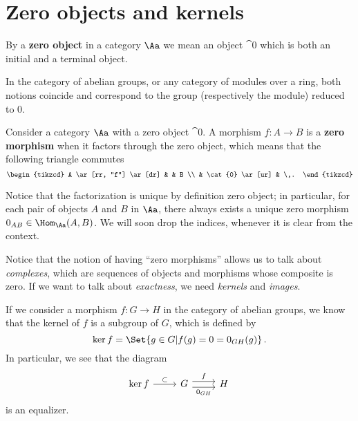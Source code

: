 \section{Zero objects and kernels}

\begin{df}
    By a \textbf{zero object} in a category $\Aa$
    we mean an object $\cat{0}$ which is both 
    an initial and a terminal object.
\end{df}

\begin{ex}
    In the category of abelian groups, or any category of modules over a ring, both notions coincide and correspond to the group (respectively the module) reduced to {0}.
\end{ex}

\begin{df}
    Consider a category $\Aa$ with a zero object $\cat{0}$.
    A morphism $f : A \to B$ is a \textbf{zero morphism}
    when it factors through the zero object, 
    which means that the following triangle commutes
    \begin{equation*}
        \begin{tikzcd}
            A \ar[rr, "f"] \ar[dr] & & B \\
            & \cat{0} \ar[ur] & \,.
        \end{tikzcd}
    \end{equation*}
\end{df}

Notice that the factorization is unique by definition
zero object; in particular, for each pair of objects
$A$ and $B$ in $\Aa$, there always exists a unique
zero morphism $0_{AB} \in \Hom_{\Aa}(A,B)$.
We will soon drop the indices, 
whenever it is clear from the context.

Notice that the notion of having ``zero morphisms'' 
allows us to talk about \emph{complexes}, which are
sequences of objects and morphisms whose composite 
is zero. If we want to talk about \emph{exactness},
we need \emph{kernels} and \emph{images}.

If we consider a morphism $f : G \to H$
in the category of abelian groups, 
we know that the kernel of $f$ is a subgroup of $G$, 
which is defined by
\begin{equation*}
    \ker f = \Set{g \in G | f(g) = 0 = 0_{GH}(g)}\,.
\end{equation*}
In particular, we see that the diagram
\begin{equation*}
    \begin{tikzcd}
        \ker f \ar[r, "\subset"]
        & G \ar[r, shift left=0.7ex, "f"] \ar[r, shift right=0.7ex, "0_{GH}"']
        & H\,
    \end{tikzcd}
\end{equation*}
is an equalizer.

